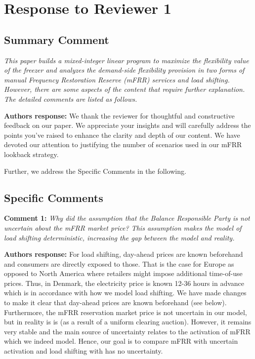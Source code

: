 \documentclass[10pt]{article}
\newcommand{\auth}{\textbf{Authors response: }}
\begin{document}
\newpage
\section{Response to Reviewer 1}

\subsection{Summary Comment} \textit{This paper builds a mixed-integer linear program to maximize the flexibility value of the freezer and analyzes the demand-side flexibility provision in two forms of manual Frequency Restoration Reserve (mFRR) services and load shifting. However, there are some aspects of the content that require further explanation. The detailed comments are listed as follows.}

\auth We thank the reviewer for thoughtful and constructive feedback on our paper. We appreciate your insights and will carefully address the points you've raised to enhance the clarity and depth of our content. We have devoted our attention to justifying the number of scenarios used in our mFRR lookback strategy.

Further, we address the Specific Comments in the following.

\subsection{Specific Comments}
\textbf{Comment 1:} \textit{Why did the assumption that the Balance Responsible Party is not uncertain about the mFRR market price? This assumption makes the model of load shifting deterministic, increasing the gap between the model and reality.}

\auth For load shifting, day-ahead prices are known beforehand and consumers are directly exposed to those. That is the case for Europe as opposed to North America where retailers might impose additional time-of-use prices. Thus, in Denmark, the electricity price is known 12-36 hours in advance which is in accordance with how we model load shifting. We have made changes to make it clear that day-ahead prices are known beforehand (see below). Furthermore, the mFRR reservation market price is not uncertain in our model, but in reality is is (as a result of a uniform clearing auction). However, it remains very stable and the main source of uncertainty relates to the activation of mFRR which we indeed model. Hence, our goal is to compare mFRR with uncertain activation and load shifting with has no uncertainty.
\end{document}
